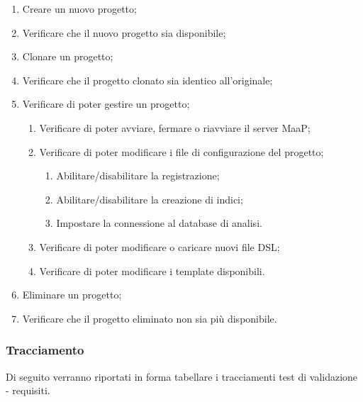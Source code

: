 \begin{enumerate}
\item Creare un nuovo progetto;
\item Verificare che il nuovo progetto sia disponibile;
\item Clonare un progetto;
\item Verificare che il progetto clonato sia identico all’originale;
\item Verificare di poter gestire un progetto;
\begin{enumerate}
\item Verificare di poter avviare, fermare o riavviare il server MaaP;
\item Verificare di poter modificare i file di configurazione del progetto;
\begin{enumerate}
\item Abilitare/disabilitare la registrazione;
\item Abilitare/disabilitare la creazione di indici;
\item Impostare la connessione al database di analisi.
\end{enumerate}
\item Verificare di poter modificare o caricare nuovi file DSL;
\item Verificare di poter modificare i template disponibili.
\end{enumerate}
\item Eliminare un progetto;
\item Verificare che il progetto eliminato non sia più disponibile.
\end{enumerate}

\subsubsection{Tracciamento}
Di seguito verranno riportati in forma tabellare i tracciamenti test di validazione - requisiti.\\
